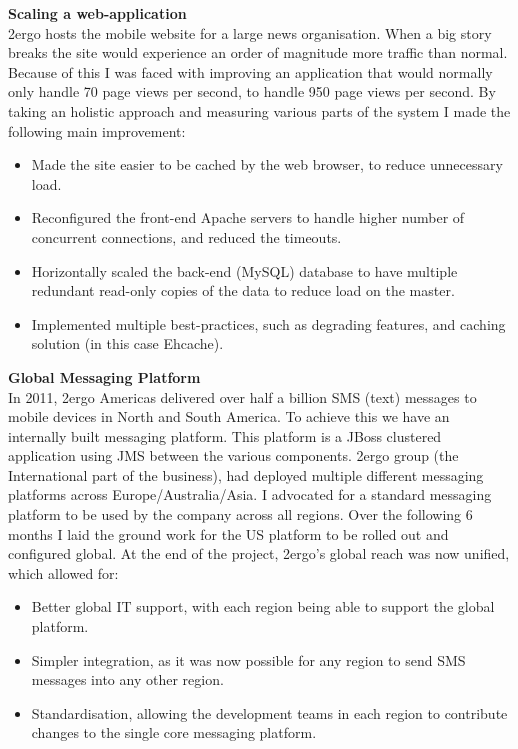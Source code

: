 \documentclass[letterpaper,10pt]{article}
\begin{document}
\textbf{Scaling a web-application}\\
2ergo hosts the mobile website for a large news organisation. When a big story breaks the site would experience an order of magnitude more traffic than normal.
Because of this I was faced with improving an application that would normally only handle 70 page views per second, to handle 950 page views per second.
By taking an holistic approach and measuring various parts of the system I made the following main improvement:

 \begin{itemize}
  \item Made the site easier to be cached by the web browser, to reduce unnecessary load.
  \item Reconfigured the front-end Apache servers to handle higher number of concurrent connections, and reduced the timeouts. 
  \item Horizontally scaled the back-end (MySQL) database to have multiple redundant read-only copies of the data to reduce load on the master.
  \item Implemented multiple best-practices, such as degrading features, and caching solution (in this case Ehcache).

 \end{itemize}
\vspace{1em}


\textbf{Global Messaging Platform}\\
In 2011, 2ergo Americas delivered over half a billion SMS (text) messages to mobile devices in North and South America. To achieve this we have an internally
built messaging platform. This platform is a JBoss clustered application using JMS between the various components. 2ergo group (the International part
of the business), had deployed multiple different messaging platforms across Europe/Australia/Asia. I advocated for a standard messaging platform to
be used by the company across all regions. Over the following 6 months I laid the ground work for the US platform to be rolled out and configured global. 
At the end of the project, 2ergo's global reach was now unified, which allowed for:
 \begin{itemize}
  \item Better global IT support, with each region being able to support the global platform.
  \item Simpler integration, as it was now possible for any region to send SMS messages into any other region.
  \item Standardisation, allowing the development teams in each region to contribute changes to the single core messaging platform.
 \end{itemize}
\vspace{1em}
\end{document}
